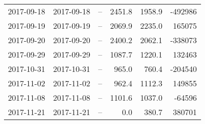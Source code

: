 \begin{table}[h]
\begin{tabular}{l l l r r r}
2017-09-18 & 2017-09-18 & -- & 2451.8 & 1958.9 & -492986\\
2017-09-19 & 2017-09-19 & -- & 2069.9 & 2235.0 & 165075\\
2017-09-20 & 2017-09-20 & -- & 2400.2 & 2062.1 & -338073\\
2017-09-29 & 2017-09-29 & -- & 1087.7 & 1220.1 & 132463\\
2017-10-31 & 2017-10-31 & -- & 965.0 & 760.4 & -204540\\
2017-11-02 & 2017-11-02 & -- & 962.4 & 1112.3 & 149855\\
2017-11-08 & 2017-11-08 & -- & 1101.6 & 1037.0 & -64596\\
2017-11-21 & 2017-11-21 & -- & 0.0 & 380.7 & 380701\\
\bottomrule
\end{tabular}
\end{table}